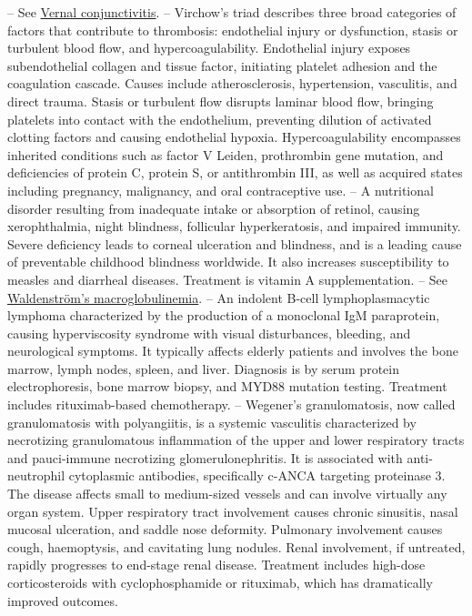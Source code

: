 -- See \hyperlink{Vernal conjunctivitis}{Vernal conjunctivitis}.
-- Virchow's triad describes three broad categories of factors that contribute to thrombosis: endothelial injury or dysfunction, stasis or turbulent blood flow, and hypercoagulability. Endothelial injury exposes subendothelial collagen and tissue factor, initiating platelet adhesion and the coagulation cascade. Causes include atherosclerosis, hypertension, vasculitis, and direct trauma. Stasis or turbulent flow disrupts laminar blood flow, bringing platelets into contact with the endothelium, preventing dilution of activated clotting factors and causing endothelial hypoxia. Hypercoagulability encompasses inherited conditions such as factor V Leiden, prothrombin gene mutation, and deficiencies of protein C, protein S, or antithrombin III, as well as acquired states including pregnancy, malignancy, and oral contraceptive use.
-- A nutritional disorder resulting from inadequate intake or absorption of retinol, causing xerophthalmia, night blindness, follicular hyperkeratosis, and impaired immunity. Severe deficiency leads to corneal ulceration and blindness, and is a leading cause of preventable childhood blindness worldwide. It also increases susceptibility to measles and diarrheal diseases. Treatment is vitamin A supplementation.
-- See \hyperlink{Waldenström's macroglobulinemia}{Waldenström's macroglobulinemia}.
-- An indolent B-cell lymphoplasmacytic lymphoma characterized by the production of a monoclonal IgM paraprotein, causing hyperviscosity syndrome with visual disturbances, bleeding, and neurological symptoms. It typically affects elderly patients and involves the bone marrow, lymph nodes, spleen, and liver. Diagnosis is by serum protein electrophoresis, bone marrow biopsy, and MYD88 mutation testing. Treatment includes rituximab-based chemotherapy.
-- Wegener's granulomatosis, now called granulomatosis with polyangiitis, is a systemic vasculitis characterized by necrotizing granulomatous inflammation of the upper and lower respiratory tracts and pauci-immune necrotizing glomerulonephritis. It is associated with anti-neutrophil cytoplasmic antibodies, specifically c-ANCA targeting proteinase 3. The disease affects small to medium-sized vessels and can involve virtually any organ system. Upper respiratory tract involvement causes chronic sinusitis, nasal mucosal ulceration, and saddle nose deformity. Pulmonary involvement causes cough, haemoptysis, and cavitating lung nodules. Renal involvement, if untreated, rapidly progresses to end-stage renal disease. Treatment includes high-dose corticosteroids with cyclophosphamide or rituximab, which has dramatically improved outcomes.

